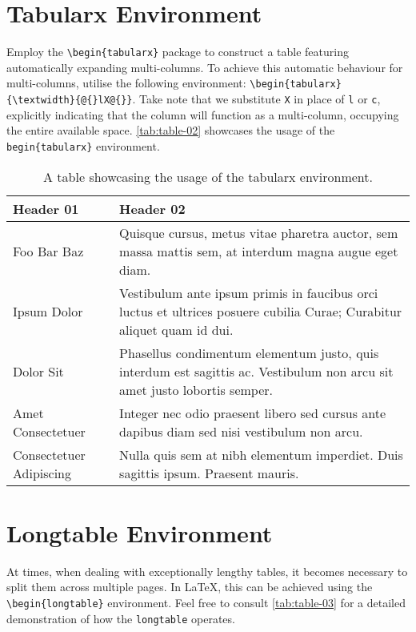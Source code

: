 \section{Tabularx Environment}
Employ the \verb|\begin{tabularx}| package to construct a table featuring automatically expanding multi-columns. To achieve this automatic behaviour for multi-columns, utilise the following environment: \verb|\begin{tabularx}{\textwidth}{@{}lX@{}}|. Take note that we substitute \verb|X| in place of \verb|l| or \verb|c|, explicitly indicating that the column will function as a multi-column, occupying the entire available space. \autoref{tab:table-02} showcases the usage of the \verb|begin{tabularx}| environment.

\begin{table}[!htpb]
    \caption{A table showcasing the usage of the tabularx environment.}
    \label{tab:table-02}
    \begin{tabularx}{\textwidth}{lX}
        \toprule
        \textbf{Header 01} & \textbf{Header 02} \\ 
        \midrule
        Foo Bar Baz & Quisque cursus, metus vitae pharetra auctor, sem massa mattis sem, at interdum magna augue eget diam. \\
        Ipsum Dolor & Vestibulum ante ipsum primis in faucibus orci luctus et ultrices posuere cubilia Curae; Curabitur aliquet quam id dui. \\
        Dolor Sit & Phasellus condimentum elementum justo, quis interdum est sagittis ac. Vestibulum non arcu sit amet justo lobortis semper. \\
        Amet Consectetuer & Integer nec odio praesent libero sed cursus ante dapibus diam sed nisi vestibulum non arcu. \\
        Consectetuer Adipiscing & Nulla quis sem at nibh elementum imperdiet. Duis sagittis ipsum. Praesent mauris. \\
        \bottomrule
    \end{tabularx}
\end{table}

\section{Longtable Environment}
At times, when dealing with exceptionally lengthy tables, it becomes necessary to split them across multiple pages. In \LaTeX, this can be achieved using the \verb|\begin{longtable}| environment. Feel free to consult \autoref{tab:table-03} for a detailed demonstration of how the \verb|longtable| operates.

